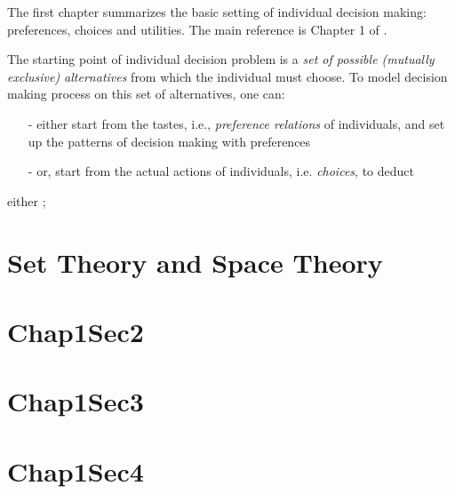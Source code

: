 \minitoc

\vspace{0.5cm}
The first chapter summarizes the basic setting of individual decision making: preferences, choices and utilities. The main reference is Chapter 1 of \citet{mas1995microeconomic}.

The starting point of individual decision problem is a \textit{set of possible (mutually exclusive) alternatives} from which the individual must choose. To model decision making process
on this set of alternatives, one can:
\begin{enumerate}
    \item[-] either start from the tastes, i.e., \textit{preference relations} of individuals, and set up the patterns of decision making with preferences
    \item[-] or, start from the actual actions of individuals, i.e. \textit{choices}, to deduct 
\end{enumerate}
either ; 

\section{Set Theory and Space Theory}\label{chap1:set_space}


\section{Chap1Sec2}\label{chap1:sec2}


\section{Chap1Sec3}\label{chap1:sec3}

\section{Chap1Sec4}\label{chap1:sec4}

